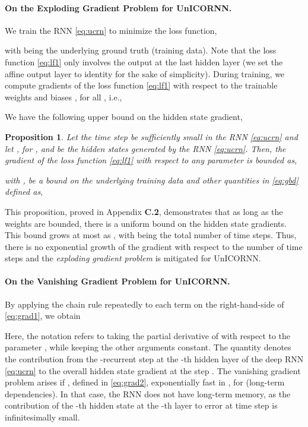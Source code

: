 \documentclass{article}
\newtheorem{proposition}[theorem]{Proposition}
\begin{document}
\paragraph{On the Exploding Gradient Problem for UnICORNN.} We train the RNN \eqref{eq:ucrn} to minimize the loss function,

with  being the underlying ground truth (training data). Note that the loss function \eqref{eq:lf1} only involves the output at the last hidden layer (we set the affine output layer to identity for the sake of simplicity). During training, we compute gradients of the loss function \eqref{eq:lf1} with respect to the trainable weights and biases , for all , i.e.,
 
We have the following upper bound on the hidden state gradient,
\begin{proposition}
\label{prop:3}
Let the time step  be sufficiently small in the RNN \eqref{eq:ucrn} and let , for , and  be the hidden states generated by the RNN \eqref{eq:ucrn}. Then, the gradient of the loss function  \eqref{eq:lf1} with respect to any parameter  is bounded as,

with , be a bound on the underlying training data and other quantities in \eqref{eq:gbd} defined as,

\end{proposition}
This proposition, proved in Appendix {\bf C.2}, demonstrates that as long as the weights  are bounded, there is a uniform bound on the hidden state gradients. This bound grows at most as , with  being the total number of time steps. Thus, there is no exponential growth of the gradient with respect to the number of time steps and the \emph{exploding gradient problem} is mitigated for UnICORNN.
\paragraph{On the Vanishing Gradient Problem for UnICORNN.}
By applying the chain rule repeatedly to each term on the right-hand-side of \eqref{eq:grad1}, we obtain 

Here, the notation  refers to taking the partial derivative of  with respect to the parameter , while keeping the other arguments constant.  The quantity  denotes the contribution from the -recurrent step at the -th hidden layer of the deep RNN \eqref{eq:ucrn} to the overall hidden state gradient at the step . The vanishing gradient problem \citep{vanish_grad} arises if , defined in \eqref{eq:grad2},  exponentially fast in , for  (long-term dependencies). In that case, the RNN does not have long-term memory, as the contribution of the -th hidden state at the -th layer to error at time step  is infinitesimally small.
\end{document}
